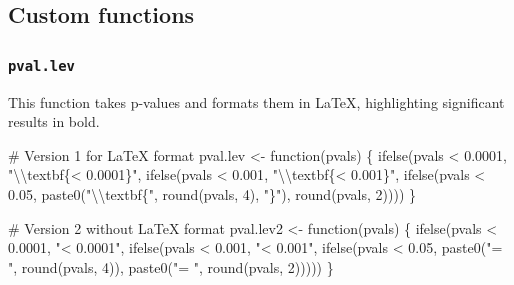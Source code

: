\documentclass[
  bookmarksnumbered]{article}
\newenvironment{Shaded}{\begin{snugshade}}{\end{snugshade}}
\newcommand{\CommentTok}[1]{\textcolor[rgb]{0.50,0.62,0.50}{#1}}
\newcommand{\ControlFlowTok}[1]{\textcolor[rgb]{0.94,0.87,0.69}{#1}}
\newcommand{\DecValTok}[1]{\textcolor[rgb]{0.86,0.86,0.80}{#1}}
\newcommand{\FloatTok}[1]{\textcolor[rgb]{0.75,0.75,0.82}{#1}}
\newcommand{\FunctionTok}[1]{\textcolor[rgb]{0.94,0.94,0.56}{#1}}
\newcommand{\NormalTok}[1]{\textcolor[rgb]{0.80,0.80,0.80}{#1}}
\newcommand{\OtherTok}[1]{\textcolor[rgb]{0.94,0.94,0.56}{#1}}
\newcommand{\SpecialCharTok}[1]{\textcolor[rgb]{0.86,0.64,0.64}{#1}}
\newcommand{\StringTok}[1]{\textcolor[rgb]{0.80,0.58,0.58}{#1}}
\begin{document}
\hypertarget{custom-functions}{%
\subsection{Custom functions}\label{custom-functions}}

\hypertarget{pval.lev}{%
\subsubsection{\texorpdfstring{\texttt{pval.lev}}{pval.lev}}\label{pval.lev}}

This function takes p-values and formats them in \LaTeX, highlighting significant results in bold.

\begin{Shaded}
\begin{Highlighting}[]
\CommentTok{\# Version 1 for LaTeX format}
\NormalTok{pval.lev }\OtherTok{\textless{}{-}} \ControlFlowTok{function}\NormalTok{(pvals) \{}
  \FunctionTok{ifelse}\NormalTok{(pvals }\SpecialCharTok{\textless{}} \FloatTok{0.0001}\NormalTok{,}
         \StringTok{"}\SpecialCharTok{\textbackslash{}\textbackslash{}}\StringTok{textbf\{\textless{} 0.0001\}"}\NormalTok{,}
         \FunctionTok{ifelse}\NormalTok{(pvals }\SpecialCharTok{\textless{}} \FloatTok{0.001}\NormalTok{,}
                \StringTok{"}\SpecialCharTok{\textbackslash{}\textbackslash{}}\StringTok{textbf\{\textless{} 0.001\}"}\NormalTok{,}
                \FunctionTok{ifelse}\NormalTok{(pvals }\SpecialCharTok{\textless{}} \FloatTok{0.05}\NormalTok{,}
                       \FunctionTok{paste0}\NormalTok{(}\StringTok{"}\SpecialCharTok{\textbackslash{}\textbackslash{}}\StringTok{textbf\{"}\NormalTok{, }\FunctionTok{round}\NormalTok{(pvals, }\DecValTok{4}\NormalTok{), }\StringTok{"\}"}\NormalTok{),}
                       \FunctionTok{round}\NormalTok{(pvals, }\DecValTok{2}\NormalTok{))))}
\NormalTok{\}}


\CommentTok{\# Version 2 without LaTeX format}
\NormalTok{pval.lev2 }\OtherTok{\textless{}{-}} \ControlFlowTok{function}\NormalTok{(pvals) \{}
  \FunctionTok{ifelse}\NormalTok{(pvals }\SpecialCharTok{\textless{}} \FloatTok{0.0001}\NormalTok{,}
         \StringTok{"\textless{} 0.0001"}\NormalTok{,}
         \FunctionTok{ifelse}\NormalTok{(pvals }\SpecialCharTok{\textless{}} \FloatTok{0.001}\NormalTok{,}
                \StringTok{"\textless{} 0.001"}\NormalTok{,}
                \FunctionTok{ifelse}\NormalTok{(pvals }\SpecialCharTok{\textless{}} \FloatTok{0.05}\NormalTok{,}
                       \FunctionTok{paste0}\NormalTok{(}\StringTok{"= "}\NormalTok{, }\FunctionTok{round}\NormalTok{(pvals, }\DecValTok{4}\NormalTok{)),}
                       \FunctionTok{paste0}\NormalTok{(}\StringTok{"= "}\NormalTok{, }\FunctionTok{round}\NormalTok{(pvals, }\DecValTok{2}\NormalTok{)))))}
\NormalTok{\}}
\end{Highlighting}
\end{Shaded}
\end{document}
